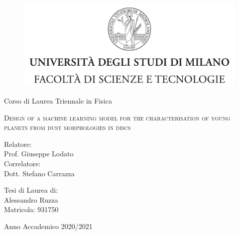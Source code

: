 

\begin{titlepage}
	
	\begin{figure}
		\centering
		\includegraphics[width=424pt]{copertina/logo.jpg}%
		\vspace{0.5 cm}
	\end{figure}
	

\begin{center}
{\LARGE Corso di Laurea Triennale in Fisica}
\end{center}

\begin{center}
\vspace{3 cm}
{\Large \textsc{Design of a machine learning model for the characterisation of young planets from dust morphologies in discs} }
\end{center}
\par
  \vspace{3 cm}
  
  \begin{flushleft}
  		 Relatore:\\ Prof. Giuseppe Lodato\\
		 
  		 \noindent Correlatore:\\ Dott. Stefano Carrazza
  \end{flushleft}
  \vspace{1 cm}
  \begin{flushright}
  	Tesi di Laurea di:\\ Alessandro Ruzza\\ Matricola: 931750
  \end{flushright}
    	  
\vfill
\begin{center}
	{\large Anno Accademico 2020/2021}
\end{center}
\end{titlepage}
